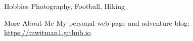 

\begin{cvskillsnoncentered}

    




  \cvskill
    {Hobbies} %
    {Photography, Football, Hiking} %
    
      \cvskill
    {More About Me} %
    {My personal web page and adventure blog: \url{https://mwitman1.github.io}} %

\end{cvskillsnoncentered}
